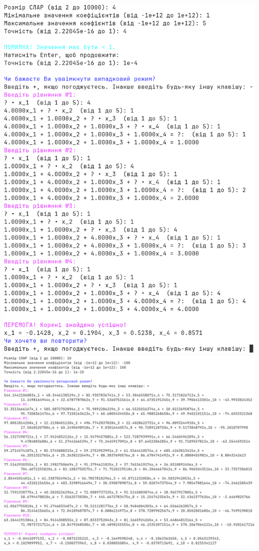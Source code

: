 \documentclass[a4paper,12pt]{extarticle}
\begin{document}
\includegraphics[height=\textheight]{examples/example3.png}\\
\includegraphics[width=\textwidth]{examples/example4.png}
\restoregeometry
\end{document}
